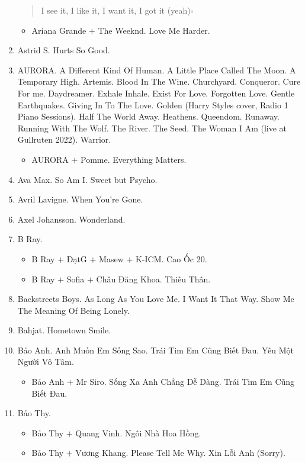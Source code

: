 \documentclass{article}
\begin{document}
\begin{enumerate}
\begin{quotation}
		I see it, I like it, I want it, I got it (yeah)\hfill$\square$
	\end{quotation}
	\begin{itemize}
		\item {\sc Ariana Grande $+$ The Weeknd.} Love Me Harder.
	\end{itemize}
	\item {\sc Astrid S.} Hurts So Good.
	\item {\sc AURORA.} A Different Kind Of Human. A Little Place Called The Moon. A Temporary High. Artemis. Blood In The Wine. Churchyard. Conqueror. Cure For me. Daydreamer. Exhale Inhale. Exist For Love. Forgotten Love. Gentle Earthquakes. Giving In To The Love. Golden (Harry Styles  cover, Radio 1 Piano Sessions). Half The World Away. Heathens. Queendom. Runaway. Running With The Wolf. The River. The Seed. The Woman I Am (live at Gullruten 2022). Warrior.
	\begin{itemize}
		\item {\sc AURORA $+$ Pomme.} Everything Matters.
	\end{itemize}
	\item {\sc Ava Max.} So Am I. Sweet but Psycho.	
	\item {\sc Avril Lavigne.} When You're Gone.
	\item {\sc Axel Johansson.} Wonderland.
	\item {\sc B Ray.}
	\begin{itemize}
		\item {\sc B Ray $+$ ĐạtG $+$ Masew $+$ K-ICM.} Cao Ốc 20.
		\item {\sc B Ray $+$ Sofia $+$ Châu Đăng Khoa.} Thiêu Thân.
	\end{itemize}
	\item {\sc Backstreets Boys.} As Long As You Love Me. I Want It That Way. Show Me The Meaning Of Being Lonely.
	\item {\sc Bahjat.} Hometown Smile.
	\item {\sc Bảo Anh.} Anh Muốn Em Sống Sao. Trái Tim Em Cũng Biết Đau. Yêu Một Người Vô Tâm.
	\begin{itemize}
		\item {\sc Bảo Anh $+$ Mr Siro.} Sống Xa Anh Chẳng Dễ Dàng. Trái Tim Em Cũng Biết Đau.
	\end{itemize}
	\item {\sc Bảo Thy.}
	\begin{itemize}
		\item {\sc Bảo Thy $+$ Quang Vinh.} Ngôi Nhà Hoa Hồng.
		\item {\sc Bảo Thy $+$ Vương Khang.} Please Tell Me Why. Xin Lỗi Anh (Sorry).

\end{itemize}
\end{enumerate}
\end{document}
